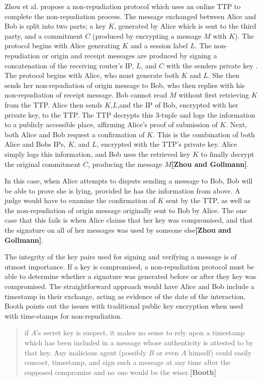 \documentclass[12pt]{article}
\newcommand{\lcite}[1]
{{\bfseries\color{orange}[#1]}}
\begin{document}
			Zhou et al. propose a non-repudiation protocol which uses an online TTP to complete the non-repudiation process. The message exchanged between Alice and Bob is split into two parts; a key $K$, generated by Alice which is sent to the third party, and a commitment $C$ (produced by encrypting a message $M$ with $K$). The protocol begins with Alice generating $K$ and a session label $L$. The non-repudiation or origin and receipt messages are produced by signing a concatenation of the receiving router's IP, $L$, and $C$ with the senders private key . The protocol begins with Alice, who must generate both $K$ and $L$. She then sends her non-repudiation of origin message to Bob, who then replies with his non-repudiation of receipt message. Bob cannot read $M$ without first retrieving $K$ from the TTP. Alice then sends $K$,$L$,and the IP of Bob, encrypted with her private key, to the TTP. The TTP decrypts this 3-tuple and logs the information to a publicly accessible place, affirming Alice's proof of submission of $K$. Next, both Alice and Bob request a confirmation of $K$. This is the combination of both Alice and Bobs IPs, $K$, and $L$, encrypted with the TTP's private key. Alice simply logs this information, and Bob uses the retrieved key $K$ to finally decrypt the original commitment $C$, producing the message $M$\lcite{Zhou and Gollmann}.

			In this case, when Alice attempts to dispute sending a message to Bob, Bob will be able to prove she is lying, provided he has the information from above. A judge would have to examine the confirmation of $K$ sent by the TTP, as well as the non-repudiation of origin message originally sent to Bob by Alice. The one case that this fails is when Alice claims that her key was compromised, and that the signature on all of her messages was used by someone else\lcite{Zhou and Gollmann}.

			The integrity of the key pairs used for signing and verifying a message is of utmost importance. If a key is compromised, a non-repudiation protocol must be able to determine whether a signature was generated before or after they key was compromised. The straightforward approach would have Alice and Bob include a timestamp in their exchange, acting as evidence of the date of the interaction. Booth points out the issues with traditional public key encryption when used with time-stamps for non-repudiation.
			\begin{quote}
				if $A$'s secret key is suspect, it makes no sense to rely upon a timestamp which has been included in a message whose authenticity is attested to by that key. Any malicious agent (possibly $B$ or even $A$ himself) could easily concoct, timestamp, and sign such a message at any time after the supposed compromise and no one would be the wiser.\lcite{Booth}
			\end{quote}
\end{document}
